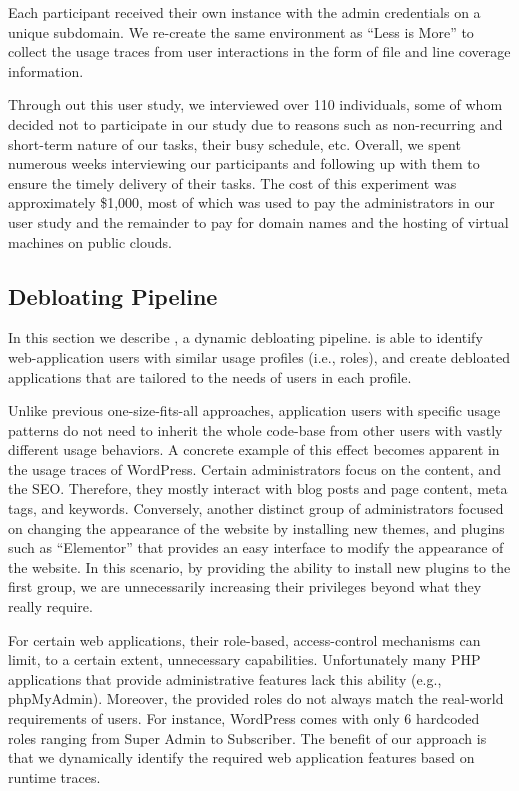 Each participant received their own instance with the admin credentials on a unique subdomain. 
We re-create the same environment as ``Less is More'' to collect the usage traces from user interactions in the form of file and line coverage information. 

Through out this user study, we interviewed over 110 individuals, some of whom decided not to participate in our study due to reasons such as non-recurring and short-term nature of our tasks, their busy schedule, etc.
Overall, we spent numerous weeks interviewing our participants and following up with them to ensure the timely delivery of their tasks. The cost of this experiment was approximately \$1,000, most of which was used to pay the administrators in our user study and the remainder to pay for domain names and the hosting of virtual machines on public clouds.

\subsection{Debloating Pipeline}

In this section we describe \sys{}, a dynamic debloating pipeline. 
\sys{} is able to identify web-application users with similar usage profiles (i.e., roles), and create debloated applications that are tailored to the needs of users in each profile. 


Unlike previous one-size-fits-all approaches, application users with specific usage patterns do not need to inherit the whole code-base from other users with vastly different usage behaviors. 
A concrete example of this effect becomes apparent in the usage traces of WordPress. 
Certain administrators focus on the content, and the SEO. 
Therefore, they mostly interact with blog posts and page content, meta tags, and keywords. 
Conversely, another distinct group of administrators focused on changing the appearance of the website by installing new themes, and plugins such as ``Elementor'' that provides an easy interface to modify the appearance of the website. 
In this scenario, by providing the ability to install new plugins to the first group, we are unnecessarily increasing their privileges beyond what they really require. 

For certain web applications, their role-based, access-control mechanisms can limit, to a certain extent, unnecessary capabilities.
Unfortunately many PHP applications that provide administrative features lack this ability (e.g., phpMyAdmin). 
Moreover, the provided roles do not always match the real-world requirements of users. For instance, WordPress comes with only 6 hardcoded roles ranging from Super Admin to Subscriber. 
The benefit of our approach is that we dynamically identify the required web application features based on runtime traces. 


